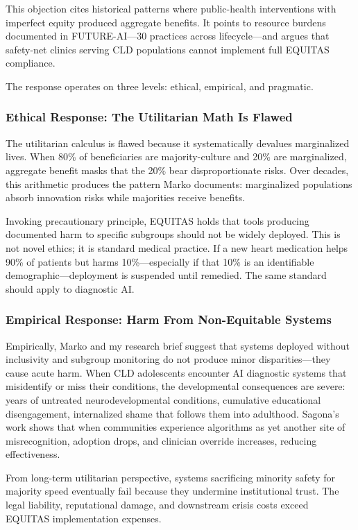 \documentclass[12pt,a4paper]{article}
\begin{document}
This objection cites historical patterns where public-health interventions with imperfect equity produced aggregate benefits. It points to resource burdens documented in FUTURE-AI—30 practices across lifecycle—and argues that safety-net clinics serving CLD populations cannot implement full EQUITAS compliance.

The response operates on three levels: ethical, empirical, and pragmatic.

\subsubsection{Ethical Response: The Utilitarian Math Is Flawed}

The utilitarian calculus is flawed because it systematically devalues marginalized lives. When 80\% of beneficiaries are majority-culture and 20\% are marginalized, aggregate benefit masks that the 20\% bear disproportionate risks. Over decades, this arithmetic produces the pattern Marko documents: marginalized populations absorb innovation risks while majorities receive benefits.

Invoking precautionary principle, EQUITAS holds that tools producing documented harm to specific subgroups should not be widely deployed. This is not novel ethics; it is standard medical practice. If a new heart medication helps 90\% of patients but harms 10\%—especially if that 10\% is an identifiable demographic—deployment is suspended until remedied. The same standard should apply to diagnostic AI.

\subsubsection{Empirical Response: Harm From Non-Equitable Systems}

Empirically, Marko and my research brief suggest that systems deployed without inclusivity and subgroup monitoring do not produce minor disparities—they cause acute harm. When CLD adolescents encounter AI diagnostic systems that misidentify or miss their conditions, the developmental consequences are severe: years of untreated neurodevelopmental conditions, cumulative educational disengagement, internalized shame that follows them into adulthood. Sagona's work shows that when communities experience algorithms as yet another site of misrecognition, adoption drops, and clinician override increases, reducing effectiveness.

From long-term utilitarian perspective, systems sacrificing minority safety for majority speed eventually fail because they undermine institutional trust. The legal liability, reputational damage, and downstream crisis costs exceed EQUITAS implementation expenses.
\end{document}
